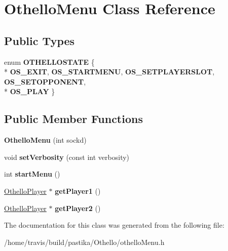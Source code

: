 \hypertarget{classOthelloMenu}{\section{Othello\-Menu Class Reference}
\label{classOthelloMenu}
}
\subsection*{Public Types}
\begin{DoxyCompactItemize}
\item 
enum {\bfseries O\-T\-H\-E\-L\-L\-O\-S\-T\-A\-T\-E} \{ \\*
{\bfseries O\-S\-\_\-\-E\-X\-I\-T}, 
{\bfseries O\-S\-\_\-\-S\-T\-A\-R\-T\-M\-E\-N\-U}, 
{\bfseries O\-S\-\_\-\-S\-E\-T\-P\-L\-A\-Y\-E\-R\-S\-L\-O\-T}, 
{\bfseries O\-S\-\_\-\-S\-E\-T\-O\-P\-P\-O\-N\-E\-N\-T}, 
\\*
{\bfseries O\-S\-\_\-\-P\-L\-A\-Y}
 \}
\end{DoxyCompactItemize}
\subsection*{Public Member Functions}
\begin{DoxyCompactItemize}
\item 
\hypertarget{classOthelloMenu_a6495e2635b5eace0d299d64ec24af66f}{{\bfseries Othello\-Menu} (int sockd)}\label{classOthelloMenu_a6495e2635b5eace0d299d64ec24af66f}

\item 
\hypertarget{classOthelloMenu_a28538903d5b5978a77d9269da29d7657}{void {\bfseries set\-Verbosity} (const int verbosity)}\label{classOthelloMenu_a28538903d5b5978a77d9269da29d7657}

\item 
\hypertarget{classOthelloMenu_a2f3bb0dfd1a33ca5d24392514f6deae2}{int {\bfseries start\-Menu} ()}\label{classOthelloMenu_a2f3bb0dfd1a33ca5d24392514f6deae2}

\item 
\hypertarget{classOthelloMenu_a26ce1dde06b0eb79ce5c167046002e20}{\hyperlink{classOthelloPlayer}{Othello\-Player} $\ast$ {\bfseries get\-Player1} ()}\label{classOthelloMenu_a26ce1dde06b0eb79ce5c167046002e20}

\item 
\hypertarget{classOthelloMenu_a95ff349f9abd80ef527a915fc2e10042}{\hyperlink{classOthelloPlayer}{Othello\-Player} $\ast$ {\bfseries get\-Player2} ()}\label{classOthelloMenu_a95ff349f9abd80ef527a915fc2e10042}

\end{DoxyCompactItemize}


The documentation for this class was generated from the following file\-:\begin{DoxyCompactItemize}
\item 
/home/travis/build/pastika/\-Othello/othello\-Menu.\-h\end{DoxyCompactItemize}
